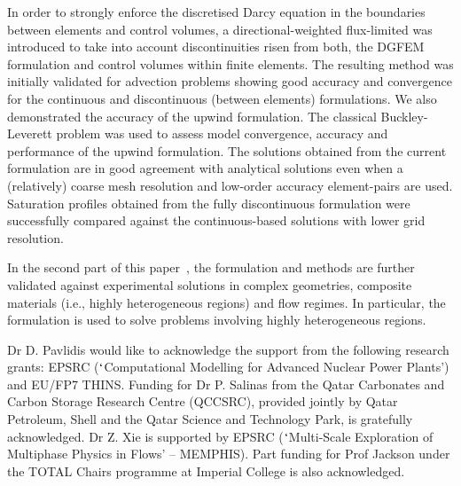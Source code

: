\documentclass[preprint,authoryear,12pt]{elsarticle}
\begin{document}
In order to strongly enforce the discretised Darcy equation in the boundaries between elements and control volumes, a directional-weighted flux-limited was introduced to take into account discontinuities risen from both, the DGFEM formulation and control volumes within finite elements.  The resulting method was initially validated for advection problems showing good accuracy and convergence for the continuous and discontinuous (between elements) formulations. We also demonstrated the accuracy of the upwind formulation. The classical Buckley-Leverett problem was used to assess model convergence, accuracy and performance of the upwind formulation. The solutions obtained from the current formulation are in good agreement with analytical solutions even when a (relatively) coarse mesh resolution and low-order accuracy element-pairs are used. Saturation profiles obtained from the fully discontinuous formulation were successfully compared against the continuous-based solutions with lower grid resolution.

In the second part of this paper~\citep{pavlidis_2015}, the formulation and methods are further validated against experimental solutions in complex geometries, composite materials (i.e., highly heterogeneous regions) and flow regimes. In particular, the formulation is used to solve problems involving highly heterogeneous regions.


\ack Dr D. Pavlidis would like to acknowledge the support from the following research grants: EPSRC ($\lq$Computational Modelling for Advanced Nuclear Power Plants') and EU/FP7 THINS. Funding for Dr P. Salinas from the Qatar Carbonates and Carbon Storage Research Centre (QCCSRC), provided jointly by Qatar Petroleum, Shell and the Qatar Science and Technology Park, is gratefully acknowledged. Dr Z. Xie is supported by EPSRC ($\lq$Multi-Scale Exploration of Multiphase Physics in Flows' -- MEMPHIS). Part funding for Prof Jackson under the TOTAL Chairs programme at Imperial College is also acknowledged.







\pagebreak
\clearpage

\pagebreak
\clearpage



\end{document}
